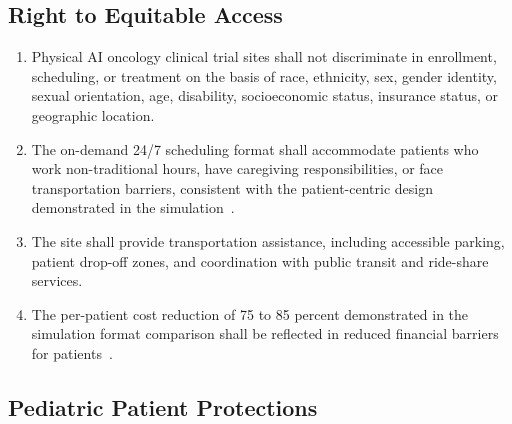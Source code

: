 \documentclass[11pt,letterpaper]{article}
\begin{document}
\subsection{Right to Equitable Access}

\begin{enumerate}[label=(\alph*)]
\item Physical AI oncology clinical trial sites shall not discriminate in
  enrollment, scheduling, or treatment on the basis of race, ethnicity, sex,
  gender identity, sexual orientation, age, disability, socioeconomic status,
  insurance status, or geographic location.

\item The on-demand 24/7 scheduling format shall accommodate patients who work
  non-traditional hours, have caregiving responsibilities, or face
  transportation barriers, consistent with the patient-centric design
  demonstrated in the simulation~\cite{formatcomparison2026}.

\item The site shall provide transportation assistance, including accessible
  parking, patient drop-off zones, and coordination with public transit and
  ride-share services.

\item The per-patient cost reduction of 75 to 85 percent demonstrated in the
  simulation format comparison shall be reflected in reduced financial barriers
  for patients~\cite{formatcomparison2026}.
\end{enumerate}

\subsection{Pediatric Patient Protections}
\end{document}
